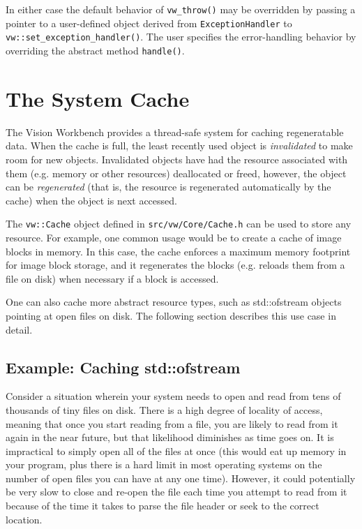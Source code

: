 In either case the default behavior of \verb#vw_throw()# may be
overridden by passing a pointer to a user-defined object derived from
\verb#ExceptionHandler# to \verb#vw::set_exception_handler()#.  The
user specifies the error-handling behavior by overriding the abstract
method \verb#handle()#.

\section{The System Cache}
\label{sec:cache}

The Vision Workbench provides a thread-safe system for caching
regeneratable data.  When the cache is full, the least recently used
object is {\em invalidated} to make room for new objects.  Invalidated
objects have had the resource associated with them (e.g. memory or
other resources) deallocated or freed, however, the object can be {\em
  regenerated} (that is, the resource is regenerated automatically by
the cache) when the object is next accessed.

The \verb#vw::Cache# object defined in \verb#src/vw/Core/Cache.h# can
be used to store any resource.  For example, one common usage would be
to create a cache of image blocks in memory.  In this case, the cache
enforces a maximum memory footprint for image block storage, and it
regenerates the blocks (e.g. reloads them from a file on disk) when
necessary if a block is accessed.

One can also cache more abstract resource types, such as std::ofstream
objects pointing at open files on disk. The following section
describes this use case in detail.

\subsection{Example: Caching std::ofstream}

Consider a situation wherein your system needs to open and read from
tens of thousands of tiny files on disk.  There is a high degree of
locality of access, meaning that once you start reading from a file,
you are likely to read from it again in the near future, but that
likelihood diminishes as time goes on.  It is impractical to simply
open all of the files at once (this would eat up memory in your
program, plus there is a hard limit in most operating systems on the
number of open files you can have at any one time).  However, it could
potentially be very slow to close and re-open the file each time you
attempt to read from it because of the time it takes to parse the file
header or seek to the correct location.

